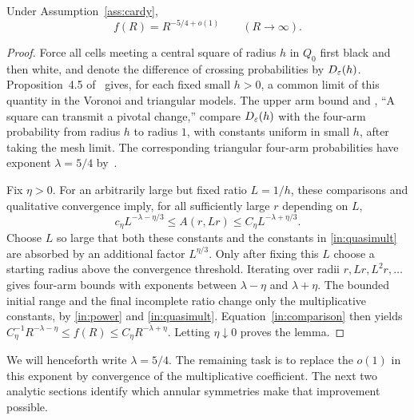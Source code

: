 \begin{lemma}\label{in:exponent}
Under Assumption~\ref{ass:cardy},
\begin{equation}\label{in:exponent-eq}
 f(R)=R^{-5/4+o(1)}\qquad(R\to\infty).
\end{equation}
\end{lemma}
\begin{proof}
Force all cells meeting a central square of radius $h$ in $Q_0$
first black and then white, and denote the difference of crossing
probabilities by $D_\varepsilon(h)$. Proposition~4.5 of~\cite{V} gives,
for each fixed small $h>0$, a common limit of this quantity in the
Voronoi and triangular models. The upper arm bound and
\cite[Lemma~6.1]{V}, ``A square can transmit a pivotal change,''
compare $D_\varepsilon(h)$ with the four-arm probability from radius $h$
to radius $1$, with constants uniform in small $h$, after taking
the mesh limit. The corresponding triangular four-arm probabilities
have exponent $\lambda=5/4$ by~\cite{SW}.

Fix $\eta>0$. For an arbitrarily large but fixed ratio $L=1/h$,
these comparisons and qualitative convergence imply, for all
sufficiently large $r$ depending on $L$,
\[
 c_\eta L^{-\lambda-\eta/3}
 \le A(r,Lr)\le C_\eta L^{-\lambda+\eta/3}.
\]
Choose $L$ so large that both these constants and the constants in
\eqref{in:quasimult} are absorbed by an additional factor
$L^{\eta/3}$. Only after fixing this $L$ choose a starting radius
above the convergence threshold. Iterating over radii $r,Lr,L^2r,
\ldots$ gives four-arm bounds with exponents between
$\lambda-\eta$ and $\lambda+\eta$. The bounded initial range and
the final incomplete ratio change only the multiplicative constants,
by \eqref{in:power} and \eqref{in:quasimult}. Equation~\eqref{in:comparison}
then yields
$C_\eta^{-1}R^{-\lambda-\eta}\le f(R)\le C_\eta R^{-\lambda+\eta}$.
Letting $\eta\downarrow0$ proves the lemma.
\end{proof}

We will henceforth write $\lambda=5/4$. The remaining task is to
replace the $o(1)$ in this exponent by convergence of the multiplicative
coefficient. The next two analytic sections identify which annular
symmetries make that improvement possible.
